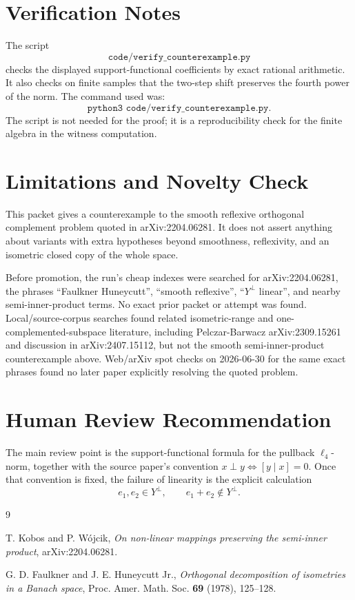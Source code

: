 \documentclass[11pt]{article}
\begin{document}
\section*{Verification Notes}

The script
\[
 \texttt{code/verify\_counterexample.py}
\]
checks the displayed support-functional coefficients by exact rational
arithmetic.  It also checks on finite samples that the two-step shift preserves
the fourth power of the norm.  The command used was:
\[
 \texttt{python3 code/verify\_counterexample.py}.
\]
The script is not needed for the proof; it is a reproducibility check for the
finite algebra in the witness computation.

\section*{Limitations and Novelty Check}

This packet gives a counterexample to the smooth reflexive orthogonal
complement problem quoted in arXiv:2204.06281.  It does not assert anything
about variants with extra hypotheses beyond smoothness, reflexivity, and an
isometric closed copy of the whole space.

Before promotion, the run's cheap indexes were searched for arXiv:2204.06281,
the phrases ``Faulkner Huneycutt'', ``smooth reflexive'', ``\(Y^\perp\)
linear'', and nearby semi-inner-product terms.  No exact prior packet or
attempt was found.  Local/source-corpus searches found related isometric-range
and one-complemented-subspace literature, including Pelczar-Barwacz
arXiv:2309.15261 and discussion in arXiv:2407.15112, but not the smooth
semi-inner-product counterexample above.  Web/arXiv spot checks on
2026-06-30 for the same exact phrases found no later paper explicitly
resolving the quoted problem.

\section*{Human Review Recommendation}

The main review point is the support-functional formula for the pullback
\(\ell_4\)-norm, together with the source paper's convention
\(x\perp y \Leftrightarrow [y\mid x]=0\).  Once that convention is fixed, the
failure of linearity is the explicit calculation
\[
e_1,e_2\in Y^\perp,\qquad e_1+e_2\notin Y^\perp .
\]

\begin{thebibliography}{9}

T. Kobos and P. W\'ojcik,
\emph{On non-linear mappings preserving the semi-inner product},
arXiv:2204.06281.

G. D. Faulkner and J. E. Huneycutt Jr.,
\emph{Orthogonal decomposition of isometries in a Banach space},
Proc. Amer. Math. Soc. \textbf{69} (1978), 125--128.

\end{thebibliography}
\end{document}
